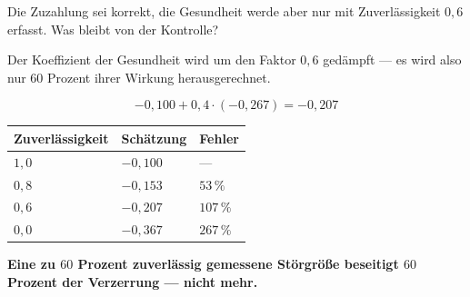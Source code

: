 \begin{aufgabe}
Die Zuzahlung sei korrekt, die Gesundheit werde aber nur mit Zuverlässigkeit $0{,}6$ erfasst. Was bleibt von der Kontrolle?

\loesung
{}
Der Koeffizient der Gesundheit wird um den Faktor $0{,}6$ gedämpft --- es wird also nur $60$ Prozent ihrer Wirkung herausgerechnet.

\[ -0{,}100 + 0{,}4\cdot(-0{,}267) = -0{,}207 \]

\begin{center}
{\small
\renewcommand{\arraystretch}{1.48}
\begin{tabular}{@{}P{2.8cm}P{2.2cm}P{2.2cm}@{}}
\toprule
\textbf{Zuverläs\-sigkeit} & \textbf{Schätzung} & \textbf{Fehler}\\
\midrule
$1{,}0$ & $-0{,}100$ & ---\\
$0{,}8$ & $-0{,}153$ & $53\,\%$\\
$0{,}6$ & $-0{,}207$ & $107\,\%$\\
$0{,}0$ & $-0{,}367$ & $267\,\%$\\
\bottomrule
\end{tabular}}
\end{center}

\begin{center}
\begin{minipage}{0.9\textwidth}
\textbf{Eine zu $60$ Prozent zuverlässig gemessene Störgröße beseitigt $60$ Prozent der Verzerrung --- nicht mehr.}
\end{minipage}
\end{center}

\begin{center}
\begin{minipage}{0.88\textwidth}
\end{minipage}
\end{center}
\end{aufgabe}

